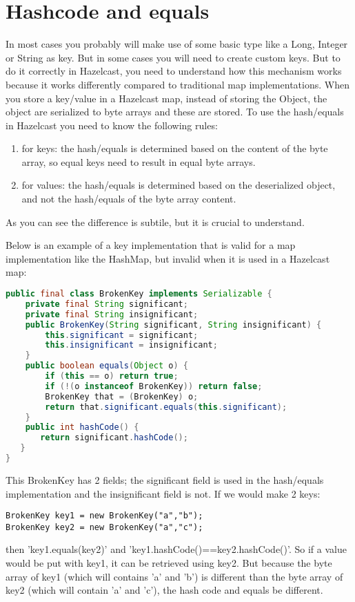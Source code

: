 \section{Hashcode and equals}
In most cases you probably will make use of some basic type like a Long, Integer or String as key. But in some cases you will need to create custom keys. But to do it correctly in Hazelcast, you need to understand how this mechanism works because it works differently compared to traditional map implementations. When you store a key/value in a Hazelcast map, instead of storing the Object, the object are serialized to byte arrays and these are stored. To use the hash/equals in Hazelcast you need to know the following rules:
\begin{enumerate}
\item for keys: the hash/equals is determined based on the content of the byte array, so equal keys need to result in equal byte arrays.
\item for values: the hash/equals is determined based on the deserialized object, and not the hash/equals of the byte array content. 
\end{enumerate}
As you can see the difference is subtile, but it is crucial to understand.

Below is an example of a key implementation that is valid for a map implementation like the HashMap, but invalid when it is used in a Hazelcast map:
\begin{lstlisting}[language=java]
public final class BrokenKey implements Serializable {
    private final String significant;
    private final String insignificant;
    public BrokenKey(String significant, String insignificant) {
        this.significant = significant;
        this.insignificant = insignificant;
    }
    public boolean equals(Object o) {
        if (this == o) return true;
        if (!(o instanceof BrokenKey)) return false;
        BrokenKey that = (BrokenKey) o;
        return that.significant.equals(this.significant);
    }
    public int hashCode() {
       return significant.hashCode();
   }
}
\end{lstlisting}
This BrokenKey has 2 fields; the significant field is used in the hash/equals implementation and the insignificant field is not. If we would make 2 keys:
\begin{lstlisting}
BrokenKey key1 = new BrokenKey("a","b");
BrokenKey key2 = new BrokenKey("a","c");
\end{lstlisting} 
then 'key1.equals(key2)' and 'key1.hashCode()==key2.hashCode()'. So if a value would be put with key1, it can be retrieved using key2. But because the byte array of key1 (which will contains 'a' and 'b') is different than the byte array of key2 (which will contain 'a' and 'c'), the hash code and equals be different. 

